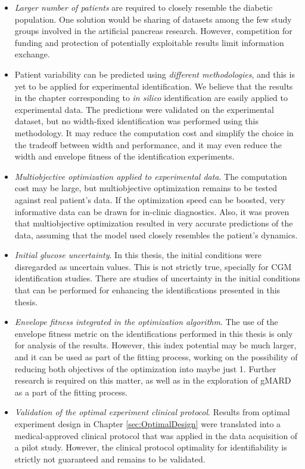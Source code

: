 \begin{itemize}
	\item \textit{Larger number of patients} are required to closely resemble the diabetic population. One solution would be sharing of datasets among the few study groups involved in the artificial pancreas research. However, competition for funding and protection of potentially exploitable results limit information exchange. 
	\item Patient variability can be predicted using \textit{different methodologies}, and this is yet to be applied for experimental identification. We believe that the results in the chapter corresponding to \textit{in silico} identification are easily applied to experimental data. The predictions were validated on the experimental dataset, but no width-fixed identification was performed using this methodology. It may reduce the computation cost and simplify the choice in the tradeoff between width and performance, and it may even reduce the width and envelope fitness of the identification experiments.
	\item \textit{Multiobjective optimization applied to experimental data}. The computation cost may be large, but multiobjective optimization remains to be tested against real patient's data. If the optimization speed can be boosted, very informative data can be drawn for in-clinic diagnostics. Also, it was proven that multiobjective optimization resulted in very accurate predictions of the data, assuming that the model used closely resembles the patient's dynamics.
	\item \textit{Initial glucose uncertainty}. In this thesis, the initial conditions were disregarded as uncertain values. This is not strictly true, specially for CGM identification studies. There are studies of uncertainty in the initial conditions that can be performed for enhancing the identifications presented in this thesis.
	\item \textit{Envelope fitness integrated in the optimization algorithm}. The use of the envelope fitness metric on the identifications performed in this thesis is only for analysis of the results. However, this index potential may be much larger, and it can be used as part of the fitting process, working on the possibility of reducing both objectives of the optimization into maybe just 1. Further research is required on this matter, as well as in the exploration of gMARD as a part of the fitting process.
	\item \textit{Validation of the optimal experiment clinical protocol}. Results from optimal experiment design in Chapter \ref{sec:OptimalDesign} were translated into a medical-approved clinical protocol that was applied in the data acquisition of a pilot study. However, the clinical protocol optimality for identifiability is strictly not guaranteed and remains to be validated.

\end{itemize}
